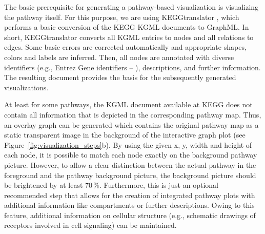\documentclass{bioinfo}
\begin{document}
The basic prerequisite for generating a pathway-based visualization is visualizing the pathway
itself. For this purpose, we are using KEGGtranslator \citep[see][]{Wrzodek2011}, which performs a
basic conversion of the KEGG KGML documents to GraphML. In short, KEGGtranslator converts all KGML entries to nodes
and all relations to edges. Some basic errors are corrected automatically and appropriate shapes,
colors and labels are inferred. Then, all nodes are annotated with diverse identifiers (e.g., Entrez Gene
identifiers -- \citealp{EntrezGene}),
descriptions, and further information. The resulting document provides the basis for the
subsequently generated visualizations.

%

At least for some pathways, the KGML document available at KEGG does not contain all information
that is depicted in the corresponding pathway map. Thus, an overlay graph can be generated which contains the
original pathway map as a static transparent image in the background of the interactive graph plot
(see Figure~\ref{fig:visualization_steps}b). By using the given x, y, width and height of each node, it is possible
to match each node exactly on the background pathway picture. However, to allow a clear distinction between the actual pathway in the foreground and the pathway background picture, the background picture should be brightened by at least 70\,\%. Furthermore, this is just an optional recommended step that allows for the creation of integrated pathway plots with additional information like compartments or further descriptions.
Owing to this feature, additional information on
cellular structure (e.g., schematic drawings of receptors involved in cell signaling) can be maintained.


\end{document}
